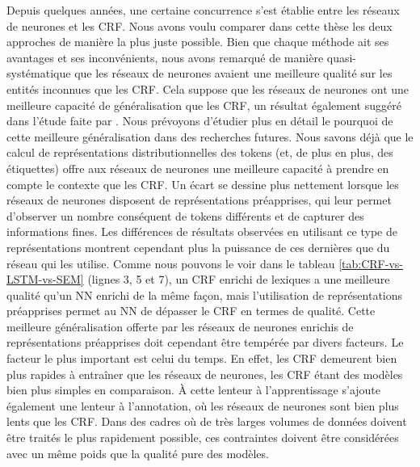 \documentclass[12pt,a4paper,times,twoside,openright]{report}
\begin{document}
Depuis quelques années, une certaine concurrence s'est établie entre les réseaux de neurones et les CRF. Nous avons voulu comparer dans cette thèse les deux approches de manière la plus juste possible. Bien que chaque méthode ait ses avantages et ses inconvénients, nous avons remarqué de manière quasi-systématique que les réseaux de neurones avaient une meilleure qualité sur les entités inconnues que les CRF. Cela suppose que les réseaux de neurones ont une meilleure capacité de généralisation que les CRF, un résultat également suggéré dans l'étude faite par \citet{augenstein2017generalisation}. Nous prévoyons d'étudier plus en détail le pourquoi de cette meilleure généralisation dans des recherches futures. Nous savons déjà que le calcul de représentations distributionnelles des tokens (et, de plus en plus, des étiquettes) offre aux réseaux de neurones une meilleure capacité à prendre en compte le contexte que les CRF. Un écart se dessine plus nettement lorsque les réseaux de neurones disposent de représentations préapprises, qui leur permet d'observer un nombre conséquent de tokens différents et de capturer des informations fines. Les différences de résultats observées en utilisant ce type de représentations montrent cependant plus la puissance de ces dernières que du réseau qui les utilise. Comme nous pouvons le voir dans le tableau \ref{tab:CRF-vs-LSTM-vs-SEM} (lignes 3, 5 et 7), un CRF enrichi de lexiques a une meilleure qualité qu'un NN enrichi de la même façon, mais l'utilisation de représentations préapprises permet au NN de dépasser le CRF en termes de qualité. Cette meilleure généralisation offerte par les réseaux de neurones enrichis de représentations préapprises doit cependant être tempérée par divers facteurs. Le facteur le plus important est celui du temps. En effet, les CRF demeurent bien plus rapides à entraîner que les réseaux de neurones, les CRF étant des modèles bien plus simples en comparaison. À cette lenteur à l'apprentissage s'ajoute également une lenteur à l'annotation, où les réseaux de neurones sont bien plus lents que les CRF. Dans des cadres où de très larges volumes de données doivent être traités le plus rapidement possible, ces contraintes doivent être considérées avec un même poids que la qualité pure des modèles.
\end{document}
